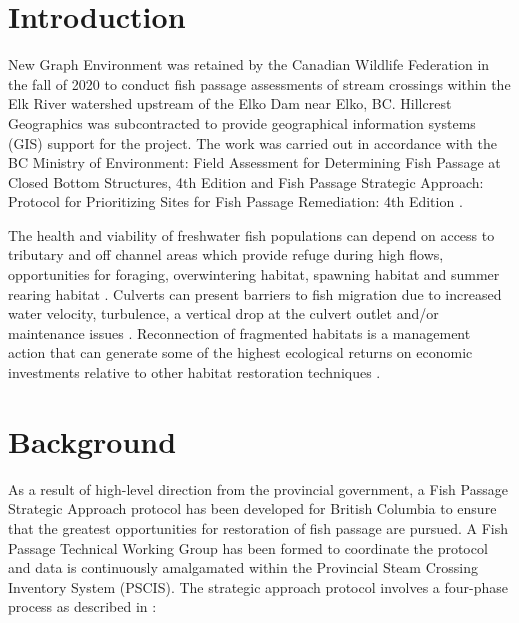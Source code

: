 \documentclass[
]{book}
\begin{document}
\hypertarget{intro}{%
\chapter{Introduction}\label{intro}}

New Graph Environment was retained by the Canadian Wildlife Federation in the fall of 2020 to conduct fish passage assessments of stream crossings within the Elk River watershed upstream of the Elko Dam near Elko, BC. Hillcrest Geographics was subcontracted to provide geographical information systems (GIS) support for the project. The work was carried out in accordance with the BC Ministry of Environment: Field Assessment for Determining Fish Passage at Closed Bottom Structures, 4th Edition \citep{fish_passage_assessments} and Fish Passage Strategic Approach: Protocol for Prioritizing Sites for Fish Passage Remediation: 4th Edition \citep{fishpassagetechnicalworkinggroupFishPassageStrategic2014}.

The health and viability of freshwater fish populations can depend on access to tributary and off channel areas which provide refuge during high flows, opportunities for foraging, overwintering habitat, spawning habitat and summer rearing habitat \citep{Bramblett_2002, swalesRoleOffChannelPonds1989}. Culverts can present barriers to fish migration due to increased water velocity, turbulence, a vertical drop at the culvert outlet and/or maintenance issues \citep{slaneyFishHabitatRehabilitation1997}. Reconnection of fragmented habitats is a management action that can generate some of the highest ecological returns on economic investments relative to other habitat restoration techniques \citep{saldicaromileStreamHabitatRestoration2004}.

\hypertarget{background}{%
\chapter{Background}\label{background}}

As a result of high-level direction from the provincial government, a Fish Passage Strategic Approach protocol has been developed for British Columbia to ensure that the greatest opportunities for restoration of fish passage are pursued. A Fish Passage Technical Working Group has been formed to coordinate the protocol and data is continuously amalgamated within the Provincial Steam Crossing Inventory System (PSCIS). The strategic approach protocol involves a four-phase process as described in \citet{fishpassagetechnicalworkinggroupFishPassageStrategic2014} :
\end{document}
